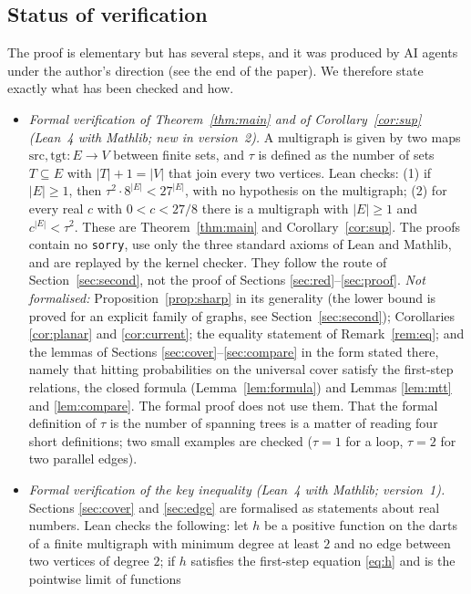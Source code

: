 \documentclass[11pt]{amsart}
\theoremstyle{plain}
\theoremstyle{remark}
\newcommand{\code}[1]{\texttt{#1}}
\begin{document}
\subsection*{Status of verification}
The proof is elementary but has several steps, and it was produced by AI agents under the author's direction (see
the end of the paper). We therefore state exactly what has been checked and how.
\begin{itemize}
\item \emph{Formal verification of Theorem~\ref{thm:main} and of Corollary~\ref{cor:sup} (Lean~4 with Mathlib; new
  in version~2).} A multigraph is given by two maps $\mathrm{src},\mathrm{tgt}\colon E\to V$ between finite sets,
  and $\tau$ is defined as the number of sets $T\subseteq E$ with $|T|+1=|V|$ that join every two vertices. Lean
  checks: (1) if $|E|\ge1$, then $\tau^2\cdot8^{|E|}<27^{|E|}$, with no hypothesis on the multigraph; (2) for every
  real $c$ with $0<c<27/8$ there is a multigraph with $|E|\ge1$ and $c^{|E|}<\tau^2$. These are
  Theorem~\ref{thm:main} and Corollary~\ref{cor:sup}. The proofs contain no \code{sorry}, use only the three
  standard axioms of Lean and Mathlib, and are replayed by the kernel checker. They follow the route of
  Section~\ref{sec:second}, not the proof of Sections \ref{sec:red}--\ref{sec:proof}.
  \emph{Not formalised:} Proposition~\ref{prop:sharp} in its generality (the lower bound is proved for an explicit
  family of graphs, see Section~\ref{sec:second}); Corollaries \ref{cor:planar} and \ref{cor:current}; the equality
  statement of Remark~\ref{rem:eq}; and the lemmas of Sections \ref{sec:cover}--\ref{sec:compare} in the form
  stated there, namely that hitting probabilities on the universal cover satisfy the first-step relations, the
  closed formula (Lemma~\ref{lem:formula}) and Lemmas \ref{lem:mtt} and \ref{lem:compare}. The formal proof does
  not use them. That the formal definition of $\tau$ is the number of spanning trees is a matter of reading four
  short definitions; two small examples are checked ($\tau=1$ for a loop, $\tau=2$ for two parallel edges).
\item \emph{Formal verification of the key inequality (Lean~4 with Mathlib; version~1).} Sections \ref{sec:cover} and
  \ref{sec:edge} are formalised as statements about real numbers. Lean checks the following: let $h$ be a positive
  function on the darts of a finite multigraph with minimum degree at least $2$ and no edge between two vertices of
  degree $2$; if $h$ satisfies the first-step equation \eqref{eq:h} and is the pointwise limit of functions

\end{itemize}
\end{document}
